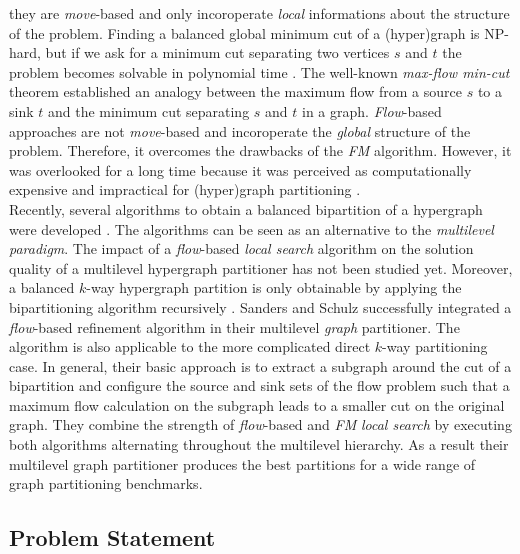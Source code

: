 they are \emph{move}-based and only incoroperate \emph{local} informations about the structure of the problem.
Finding a balanced global minimum cut of a (hyper)graph is NP-hard, but if we ask for a minimum
cut separating two vertices $s$ and $t$ the problem becomes solvable in polynomial time \cite{edmonds1972theoretical}.
The well-known \emph{max-flow min-cut} theorem \cite{ford1956maximal} established an analogy
between the maximum flow from a source $s$ to a sink $t$ and the minimum cut separating
$s$ and $t$ in a graph. \emph{Flow}-based approaches are not \emph{move}-based and
incoroperate the \emph{global} structure of the problem.
Therefore, it overcomes the drawbacks of the \emph{FM} algorithm. However, it was overlooked for a long time because
it was perceived as computationally expensive and impractical for (hyper)graph partitioning
\cite{liu1998network}. \\ 
Recently, several algorithms to obtain a balanced bipartition of a hypergraph were developed
\cite{liu1998network,patkar2004efficient,yang1996balanced}. The algorithms can be seen
as an alternative to the \emph{multilevel paradigm}. The impact of a \emph{flow}-based 
\emph{local search} algorithm on the solution quality of a multilevel hypergraph partitioner 
has not been studied yet. Moreover, a balanced $k$-way hypergraph partition is only 
obtainable by applying the bipartitioning algorithm recursively \cite{yang1996balanced}.
Sanders and Schulz \cite{sanders2011engineering} successfully integrated a \emph{flow}-based refinement
algorithm in their multilevel \emph{graph} partitioner. The algorithm is also applicable to the more
complicated direct $k$-way partitioning case. In general, their basic approach is to 
extract a subgraph around the cut of a bipartition and configure the source and sink sets
of the flow problem such that a maximum flow calculation on the subgraph leads to a 
smaller cut on the original graph. They combine the strength of \emph{flow}-based and \emph{FM}
\emph{local search} by executing both algorithms alternating throughout the multilevel hierarchy.
As a result their multilevel graph partitioner produces the best partitions for 
a wide range of graph partitioning benchmarks. 

\subsection{Problem Statement}


